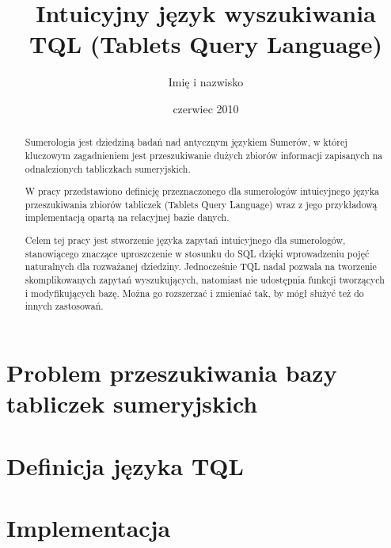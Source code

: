 \documentclass{pracamgr}
\author{Imię i nazwisko}
\title{Intuicyjny język wyszukiwania TQL (Tablets Query Language)}
\date{czerwiec 2010}
\begin{document}
\maketitle

\begin{abstract}
Sumerologia jest dziedziną badań nad antycznym językiem Sumerów, w której
kluczowym zagadnieniem jest przeszukiwanie dużych zbiorów informacji
zapisanych na odnalezionych tabliczkach sumeryjskich.

W pracy przedstawiono definicję przeznaczonego dla sumerologów intuicyjnego
języka przeszukiwania zbiorów tabliczek (Tablets Query Language) wraz z jego
przykładową implementacją opartą na relacyjnej bazie danych.

Celem tej pracy jest stworzenie języka zapytań intuicyjnego dla sumerologów,
stanowiącego znaczące uproszczenie w stosunku do SQL dzięki wprowadzeniu pojęć 
naturalnych dla rozważanej dziedziny. Jednocześnie TQL nadal
pozwala na tworzenie skomplikowanych zapytań wyszukujących, natomiast nie 
udostępnia funkcji tworzących i modyfikujących bazę. Można go rozszerzać 
i zmieniać tak, by mógł służyć też do innych zastosowań.
\end{abstract}

\tableofcontents

\part{Problem przeszukiwania bazy tabliczek sumeryjskich}




\part{Definicja języka TQL}


\part{Implementacja}





\end{document}
